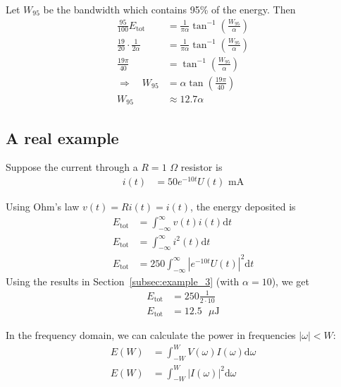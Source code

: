 \documentclass[twocolumn]{myarticle}
\renewcommand{\d}{\mathrm{d}}
\begin{document}
Let $ W_{95} $ be the bandwidth which contains 95\% of the energy.
Then
\begin{align}
    \frac{95}{100} E_\text{tot} &= \frac{1}{\pi \alpha} \tan^{-1} \left( \frac{W_{95}}{\alpha} \right)
    \\
    \frac{19}{20} \cdot \frac{1}{2 \alpha} &= \frac{1}{\pi \alpha} \tan^{-1} \left( \frac{W_{95}}{\alpha} \right)
    \\
    \frac{19 \pi}{40} &= \tan^{-1} \left( \frac{W_{95}}{\alpha} \right)
    \\
    \Longrightarrow \quad W_{95} &= \alpha \tan \left( \frac{19 \pi}{40} \right)
    \\
    W_{95} &\approx 12.7 \alpha
\end{align}

\subsection{A real example}
\label{subsec:a_real_example}

Suppose the current through a $ R = 1 $ $ \Omega $ resistor is
\begin{align}
    i(t) &= 50 e^{-10 t} U(t) \text{ mA}
\end{align}

Using Ohm's law $ v(t) = R i(t) = i(t) $, the energy deposited is
\begin{align}
    E_\text{tot} &= \int_{-\infty}^{\infty} v(t) i(t) \d t
    \\
    E_\text{tot} &= \int_{-\infty}^{\infty} i^2(t) \d t
    \\
    E_\text{tot} &= 250 \int_{-\infty}^{\infty} \left| e^{-10 t} U(t) \right|^2 \d t
\end{align}
Using the results in Section~\ref{subsec:example_3} (with $ \alpha = 10 $), we get
\begin{align}
    E_\text{tot} &= 250 \frac{1}{2 \cdot 10}
    \\
    E_\text{tot} &= 12.5 \text{ ${\mu}$J}
\end{align}

In the frequency domain, we can calculate the power in frequencies $ |\omega| < W $:
\begin{align}
    E(W) &= \int_{-W}^{W} V(\omega) I(\omega) \d \omega
    \\
    E(W) &= \int_{-W}^{W} \left| I(\omega) \right|^2 \d \omega
\end{align}
\end{document}
